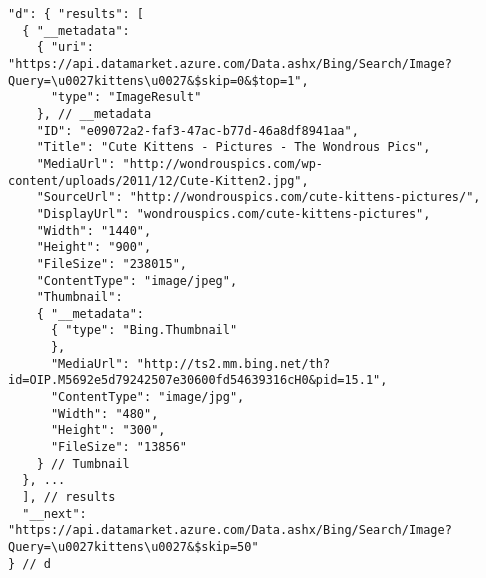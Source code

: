 \begin{verbatim}
"d": { "results": [
  { "__metadata":
    { "uri": "https://api.datamarket.azure.com/Data.ashx/Bing/Search/Image?Query=\u0027kittens\u0027&$skip=0&$top=1",
      "type": "ImageResult"
    }, // __metadata
    "ID": "e09072a2-faf3-47ac-b77d-46a8df8941aa",
    "Title": "Cute Kittens - Pictures - The Wondrous Pics",
    "MediaUrl": "http://wondrouspics.com/wp-content/uploads/2011/12/Cute-Kitten2.jpg",
    "SourceUrl": "http://wondrouspics.com/cute-kittens-pictures/",
    "DisplayUrl": "wondrouspics.com/cute-kittens-pictures",
    "Width": "1440",
    "Height": "900",
    "FileSize": "238015",
    "ContentType": "image/jpeg",
    "Thumbnail":
    { "__metadata":
      { "type": "Bing.Thumbnail"
      },
      "MediaUrl": "http://ts2.mm.bing.net/th?id=OIP.M5692e5d79242507e30600fd54639316cH0&pid=15.1",
      "ContentType": "image/jpg",
      "Width": "480",
      "Height": "300",
      "FileSize": "13856"
    } // Tumbnail
  }, ...
  ], // results
  "__next": "https://api.datamarket.azure.com/Data.ashx/Bing/Search/Image?Query=\u0027kittens\u0027&$skip=50"
} // d
\end{verbatim}



